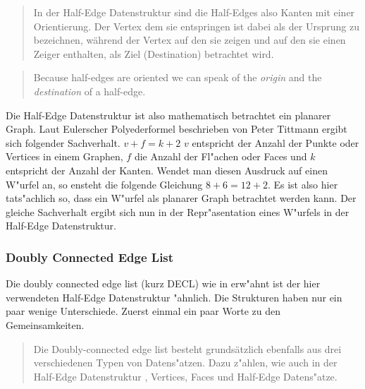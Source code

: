 \documentclass[pagesize, paper=a4, fontsize=12pt,titlepage=true, headings=small, headnosepline, abstractoff, liststotoc, nochapterprefix, plainheadsepline]{scrreprt}
\newcommand{\HES}{Half-Edge Datenstruktur }
\begin{document}
\begin{quote}In der Half-Edge Datenstruktur sind die Half-Edges also Kanten mit einer Orientierung. Der Vertex dem sie entspringen ist dabei als der Ursprung zu bezeichnen, w{\"a}hrend der Vertex auf den sie zeigen und auf den sie einen Zeiger enthalten, als Ziel (Destination) betrachtet wird. \cite[S.~31]{vanMarkdeBerg.2008}\end{quote}

\begin{quote}{\glqq}Because half-edges are oriented we can speak of the \textit{origin }and the \textit{destination }of a half-edge.{\grqq} \cite[S.~31]{vanMarkdeBerg.2008}\end{quote}

Die \HES ist also mathematisch betrachtet ein planarer Graph. Laut Eulerscher Polyederformel beschrieben von Peter Tittmann \cite[S.~47--50]{Tittmann.2011} ergibt sich folgender Sachverhalt. \(v + f = k + 2\) \(v\) entspricht der Anzahl der Punkte oder Vertices in einem Graphen, \(f\) die Anzahl der Fl"achen oder Faces und \(k\) entspricht der Anzahl der Kanten. Wendet man diesen Ausdruck auf einen W"urfel an, so ensteht die folgende Gleichung \(8 + 6 = 12 + 2\). Es ist also hier tats"achlich so, dass ein W"urfel als planarer Graph betrachtet werden kann. Der gleiche Sachverhalt ergibt sich nun in der Repr"asentation eines W"urfels in der Half-Edge Datenstruktur.

			\subsubsection {Doubly Connected Edge List}
				Die doubly connected edge list (kurz DECL) wie in \cite{vanMarkdeBerg.2008} erw"ahnt ist der hier verwendeten \HES "ahnlich. Die Strukturen haben nur ein paar wenige Unterschiede. Zuerst einmal ein paar Worte zu den Gemeinsamkeiten. \begin{quote}Die Doubly-connected edge list besteht grunds{\"a}tzlich ebenfalls aus drei verschiedenen Typen von Datens"atzen. Dazu z"ahlen, wie auch in der \HES, Vertices, Faces und Half-Edge Datens"atze. \cite[S.~31]{vanMarkdeBerg.2008}\end{quote}
\end{document}
